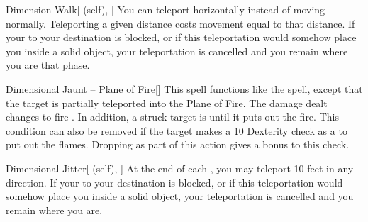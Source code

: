 \lowercase{\hypertarget{spell:Dimension Walk}{}}\label{spell:Dimension Walk}
\begin{attuneability}[Rank 4]{\hypertarget{spell:Dimension Walk}{Dimension Walk}}[ (self), ]
You can teleport horizontally instead of moving normally.
Teleporting a given distance costs movement equal to that distance.
If your  to your destination is blocked, or if this teleportation would somehow place you inside a solid object, your teleportation is cancelled and you remain where you are that phase.
\end{attuneability}
\vspace{0.25em}



\lowercase{\hypertarget{spell:Dimensional Jaunt -- Plane of Fire}{}}\label{spell:Dimensional Jaunt -- Plane of Fire}
\begin{freeability}[Rank 4]{\hypertarget{spell:Dimensional Jaunt -- Plane of Fire}{Dimensional Jaunt -- Plane of Fire}}[]
This spell functions like the  spell, except that the target is partially teleported into the Plane of Fire.
The damage dealt changes to fire .
In addition, a struck target is  until it puts out the fire.
This condition can also be removed if the target makes a  10 Dexterity check as a  to put out the flames.
Dropping  as part of this action gives a  bonus to this check.
\end{freeability}
\vspace{0.25em}



\lowercase{\hypertarget{spell:Dimensional Jitter}{}}\label{spell:Dimensional Jitter}
\begin{attuneability}[Rank 5]{\hypertarget{spell:Dimensional Jitter}{Dimensional Jitter}}[ (self), ]
At the end of each , you may teleport 10 feet in any direction.
If your  to your destination is blocked, or if this teleportation would somehow place you inside a solid object, your teleportation is cancelled and you remain where you are.
\end{attuneability}
\vspace{0.25em}



